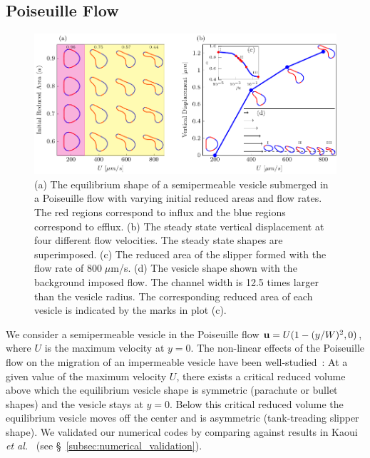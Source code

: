 \documentclass[prb,preprint,showpacs,preprintnumbers,amsmath,amssymb,longbibliography]{revtex4-1}
\newif\ifTikz
\begin{document}
\subsection{Poiseuille Flow}
\begin{figure}[htp]
  \centering
  \ifTikz
  
  \else
  \includegraphics{figures/parabolicComposite.pdf}
  \fi
  \caption{\label{fig:parabolicComposite} (a) The equilibrium shape of
  a semipermeable vesicle submerged in a Poiseuille flow with varying
  initial reduced areas and flow rates. The red regions correspond to
  influx and the blue regions correspond to efflux. (b) The steady
  state vertical displacement at four different flow velocities. The
  steady state shapes are superimposed. (c) The reduced area of the
  slipper formed with the flow rate of $800 \; \mu$m/s. (d) The vesicle
  shape shown with the background imposed flow. The channel width is
  12.5 times larger than the vesicle radius. The corresponding reduced
  area of each vesicle is indicated by the marks in plot (c).}
\end{figure}


We consider a semipermeable vesicle in the Poiseuille flow $\mathbf{u} =
U(1-(y/W)^2,0)$, where $U$ is the maximum velocity at $y=0$. The
non-linear effects of the Poiseuille flow on the migration of an
impermeable vesicle have been well-studied~\cite{kao-bir-mis2009}: At a
given value of the maximum velocity $U$, there exists a critical reduced
volume above which the equilibrium vesicle shape is symmetric (parachute
or bullet shapes) and the vesicle stays at $y=0$. Below this critical
reduced volume the equilibrium vesicle moves off the center and is
asymmetric (tank-treading slipper shape). We validated our numerical
codes by comparing against results in Kaoui {\em et
al.}~\cite{kao-bir-mis2009} (see \S~\ref{subsec:numerical_validation}).
\end{document}
